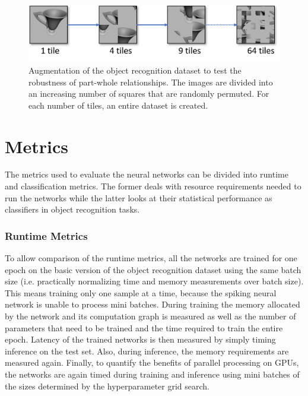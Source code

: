 \begin{figure}[H]
    \centering
    \includegraphics[width=\textwidth]{figures/picasso.png}
\caption[Augmentation of the object recognition dataset to test the robustness of part-whole relationships]{Augmentation of the object recognition dataset to test the robustness of part-whole relationships. The images are divided into an increasing number of squares that are randomly permuted. For each number of tiles, an entire dataset is created.}\label{fig:picasso}
\end{figure}\noindent
\section{Metrics}
The metrics used to evaluate the neural networks can be divided into runtime and classification metrics. The former deals with resource requirements needed to run the networks while the latter looks at their statistical performance as classifiers in object recognition tasks.
\subsubsection{Runtime Metrics}
To allow comparison of the runtime metrics, all the networks are trained for one epoch on the basic version of the object recognition dataset using the same batch size (i.e. practically normalizing time and memory measurements over batch size). This means training only one sample at a time, because the spiking neural network is unable to process mini batches. During training the memory allocated by the network and its computation graph is measured as well as the number of parameters that need to be trained and the time required to train the entire epoch. Latency of the trained networks is then measured by simply timing inference on the test set. Also, during inference, the memory requirements are measured again. Finally, to quantify the benefits of parallel processing on GPUs, the networks are again timed during training and inference using mini batches of the sizes determined by the hyperparameter grid search.
